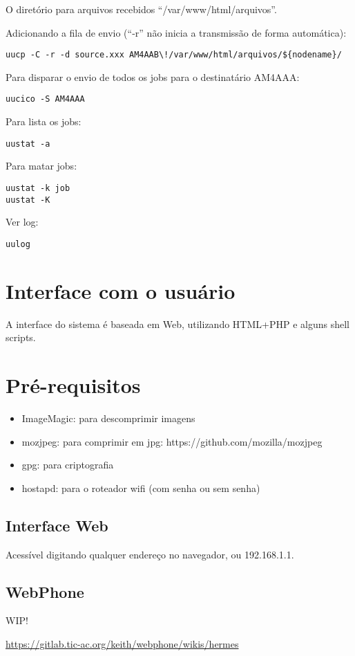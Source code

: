 \documentclass[11pt,a4paper]{article}
\begin{document}
O diretório para arquivos recebidos ``/var/www/html/arquivos''.

Adicionando a fila de envio (``-r'' não inicia a transmissão de forma
automática):
\begin{verbatim}
uucp -C -r -d source.xxx AM4AAB\!/var/www/html/arquivos/${nodename}/
\end{verbatim}

Para disparar o envio de todos os jobs para o destinatário
AM4AAA:
\begin{verbatim}
uucico -S AM4AAA
\end{verbatim}

Para lista os jobs:
\begin{verbatim}
uustat -a
\end{verbatim}

Para matar jobs:
\begin{verbatim}
uustat -k job
uustat -K
\end{verbatim}

Ver log:
\begin{verbatim}
uulog
\end{verbatim}

\section{Interface com o usuário}

A interface do sistema é baseada em Web, utilizando HTML+PHP e
alguns shell scripts.

\section{Pré-requisitos}

\begin{itemize}
\item ImageMagic: para descomprimir imagens
\item mozjpeg: para comprimir em jpg: https://github.com/mozilla/mozjpeg
\item gpg: para criptografia
\item hostapd: para o roteador wifi (com senha ou sem senha)
\end{itemize}

\subsection{Interface Web}

Acessível digitando qualquer endereço no navegador, ou 192.168.1.1.

\subsection{WebPhone}

WIP!

\url{https://gitlab.tic-ac.org/keith/webphone/wikis/hermes}
\end{document}
